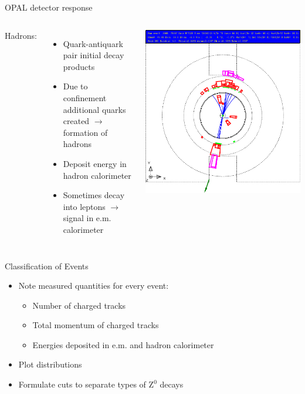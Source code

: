 \documentclass[11pt,xcolor=dvipsnames,professionalfonts]{beamer}
\begin{document}
\begin{frame}{OPAL detector response}
	\begin{columns}
		Hadrons:
		\begin{itemize}
			\setlength\itemsep{.5em}
			\item Quark-antiquark pair initial decay products
			\item Due to confinement additional quarks created $\rightarrow$ formation of hadrons
			\item Deposit energy in hadron calorimeter
			\item Sometimes decay into leptons $\rightarrow$ signal in e.m. calorimeter
		\end{itemize}
		\includegraphics[width=1.0\textwidth]{./talkfigs/pdf/qq_04.pdf}
	\end{columns}
\end{frame}

\begin{frame}{Classification of Events}
	\begin{itemize}
		\setlength\itemsep{1em}
		\item Note measured quantities for every event:
		\begin{itemize}
			\setlength\itemsep{.5em}
			\item Number of charged tracks
			\item Total momentum of charged tracks
			\item Energies deposited in e.m. and hadron calorimeter
		\end{itemize}
		\item Plot distributions
		\item Formulate cuts to separate types of $\mathrm{Z}^0$ decays
	\end{itemize}
\end{frame}
\end{document}
